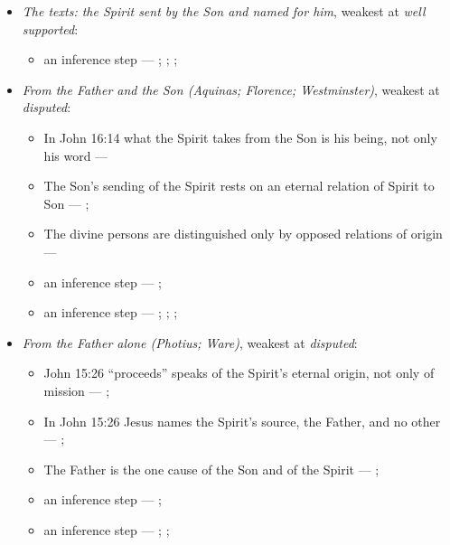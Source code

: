 \documentclass[11pt,paper=\testimonypaper,DIV=13,parskip=false]{scrartcl}
\begin{document}
\begin{itemize}
\item \emph{The texts: the Spirit sent by the Son and named for him}, weakest at \emph{well supported}:
\begin{itemize}
\item an inference step --- \cite[3, The Triune God]{kibbey-living-systematic-theology-2026}; \cite{photius-mystagogy-1987}; \cite[178]{vischer-spirit-of-god-1981}; \cite[I, q. 36, a. 2]{aquinas-summa-1920}
\end{itemize}
\item \emph{From the Father and the Son (Aquinas; Florence; Westminster)}, weakest at \emph{disputed}:
\begin{itemize}
\item In John 16:14 what the Spirit takes from the Son is his being, not only his word --- \cite[I, q. 36, a. 2]{aquinas-summa-1920}
\item The Son’s sending of the Spirit rests on an eternal relation of Spirit to Son --- \cite[I, q. 36, a. 2]{aquinas-summa-1920}; \cite[165]{vischer-spirit-of-god-1981}
\item The divine persons are distinguished only by opposed relations of origin --- \cite[I, q. 36, a. 2]{aquinas-summa-1920}
\item an inference step --- \cite[I, q. 36, a. 2]{aquinas-summa-1920}; \cite{photius-mystagogy-1987}
\item an inference step --- \cite[165--169]{vischer-spirit-of-god-1981}; \cite[144]{vischer-spirit-of-god-1981}; \cite[183--184]{vischer-spirit-of-god-1981}; \cite[I, q. 43, a. 8]{aquinas-summa-1920}
\end{itemize}
\item \emph{From the Father alone (Photius; Ware)}, weakest at \emph{disputed}:
\begin{itemize}
\item John 15:26 “proceeds” speaks of the Spirit’s eternal origin, not only of mission --- \cite[I, q. 36, a. 2]{aquinas-summa-1920}; \cite{photius-mystagogy-1987}
\item In John 15:26 Jesus names the Spirit’s source, the Father, and no other --- \cite{photius-mystagogy-1987}; \cite{ware-orthodox-church-1993}
\item The Father is the one cause of the Son and of the Spirit --- \cite{photius-mystagogy-1987}; \cite{ware-orthodox-church-1993}
\item an inference step --- \cite{photius-mystagogy-1987}; \cite[I, q. 36, a. 2]{aquinas-summa-1920}
\item an inference step --- \cite[Florence, Session 6 (1439), Laetentur caeli]{tanner-decrees-1990}; \cite{pcpcu-greek-latin-traditions-1995}; \cite{photius-mystagogy-1987}
\end{itemize}
\end{itemize}
\end{document}
